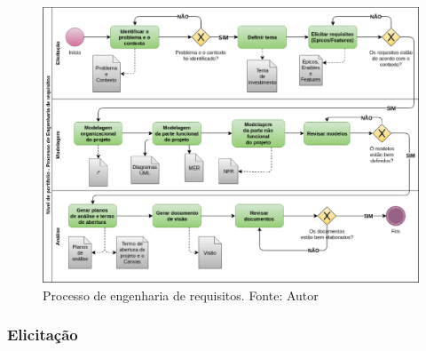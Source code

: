 \begin{figure}[h!]
	\centering
  \includegraphics[keepaspectratio=true,scale=0.5]{figuras/requisitos.eps}
  \caption[Processo de engenharia de requisitos.]{Processo de engenharia de requisitos. Fonte: Autor}
	\label{fig:requisitos}
\end{figure}

\subsubsection{Elicitação}

